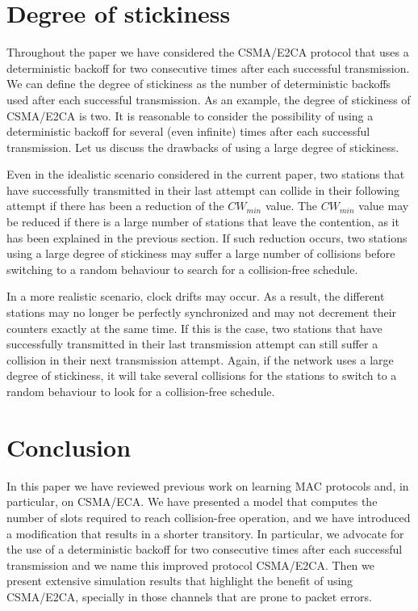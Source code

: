 \documentclass[journal]{IEEEtran}
\begin{document}
\section{Degree of stickiness}
\label{sec:stickiness}
Throughout the paper we have considered the CSMA/E2CA protocol that uses a deterministic backoff for two consecutive times after each successful transmission. We can define the degree of stickiness as the number of deterministic backoffs used after each successful transmission. As an example, the degree of stickiness of CSMA/E2CA is two. It is reasonable to consider the possibility of using a deterministic backoff for several (even infinite) times after each successful transmission. Let us discuss the drawbacks of using a large degree of stickiness. 

Even in the idealistic scenario considered in the current paper, two stations that have successfully transmitted in their last attempt can collide in their following attempt if there has been a reduction of the $CW_{min}$ value. The $CW_{min}$ value may be reduced if there is a large number of stations that leave the contention, as it has been explained in the previous section. If such reduction occurs, two stations using a large degree of stickiness may suffer a large number of collisions before switching to a random behaviour to search for a collision-free schedule.

In a more realistic scenario, clock drifts may occur. As a result, the different stations may no longer be perfectly synchronized and may not decrement their counters exactly at the same time. If this is the case, two stations that have successfully transmitted in their last transmission attempt can still suffer a collision in their next transmission attempt. Again, if the network uses a large degree of stickiness, it will take several collisions for the stations to switch to a random behaviour to look for a collision-free schedule.


\section{Conclusion}
\label{sec:conclusion}

In this paper we have reviewed previous work on learning MAC protocols and, in particular, on CSMA/ECA. We have presented a model that computes the number of slots required to reach collision-free operation, and we have introduced a modification that results in a shorter transitory. In particular, we advocate for the use of a deterministic backoff for two consecutive times after each successful transmission and we name this improved protocol CSMA/E2CA. Then we present extensive simulation results that highlight the benefit of using CSMA/E2CA, specially in those channels that are prone to packet errors.
\end{document}
